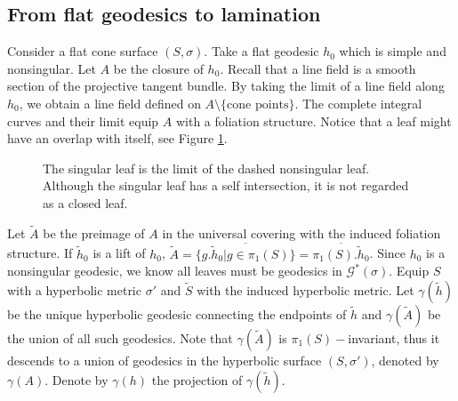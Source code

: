 \documentclass[reqno]{amsart}
\theoremstyle{plain}
\theoremstyle{definition}
\theoremstyle{remark}
\theoremstyle{definition}
\newcommand{\?}{\textcolor{red}{?}}
\newcommand{\Gssigma}{\mathcal{G}^*(\sigma) }
\begin{document}
\subsection{From flat geodesics to lamination}\label{foliation_structure}

Consider a flat cone surface $(S,\sigma)$. Take a flat geodesic $h_0$ which is simple and nonsingular. Let $A$ be the closure of $h_0$. Recall that a line field is a smooth section of the projective tangent bundle. By taking the limit of a line field along $h_0$, we obtain a line field defined on $A\setminus\{\text{cone points}\}$. The complete integral curves and their limit equip $A$ with a foliation structure. Notice that a leaf might have an overlap with itself, see Figure \ref{leaf_overlap}.

\begin{figure}[h]
    \centering
    \caption{The singular leaf is the limit of the dashed nonsingular leaf. Although the singular leaf has a self intersection, it is not regarded as a closed leaf.}
    \label{leaf_overlap}
\end{figure}

Let $\tilde{A}$ be the preimage of $A$ in the universal covering with the induced foliation structure. If $\tilde{h}_0$ is a lift of $h_0$, $\tilde{A}=\overline{\{g.\tilde{h}_0| g\in \pi_1(S)\}}=\overline{\pi_1(S).\tilde{h}_0}$. Since $h_0$ is a nonsingular geodesic, we know all leaves must be geodesics in $\Gssigma$. Equip $S$ with a hyperbolic metric $\sigma'$ and $\tilde{S}$ with the induced hyperbolic metric. Let $\gamma(\tilde{h})$ be the unique hyperbolic geodesic connecting the endpoints of $\tilde{h}$ and $\gamma(\tilde{A})$ be the union of all such geodesics. Note that $\gamma(\tilde{A})$ is $\pi_1(S)-$invariant, thus it descends to a union of geodesics in the hyperbolic surface $(S,\sigma')$, denoted by $\gamma(A)$. Denote by $\gamma(h)$ the projection of $\gamma(\tilde{h})$.
\end{document}
